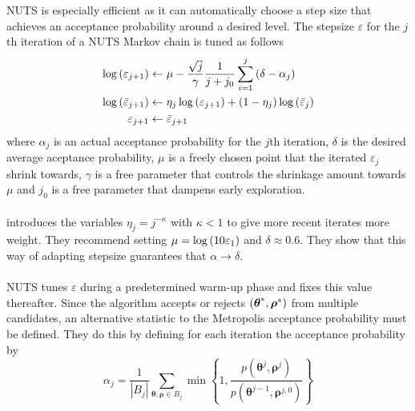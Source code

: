 \\
\\
NUTS is especially efficient as it can automatically choose a step size that achieves an acceptance probability around a desired level. The stepsize $\varepsilon$ for the $j$th iteration of a NUTS Markov chain is tuned as follows
\begin{equation*}
    \begin{split}
        \log\left (\varepsilon_{j+1}\right) &\leftarrow \mu - \frac{\sqrt{j}}{\gamma} \frac{1}{j + j_0} \sum_{i=1}^j \left (\delta - \alpha_j\right)\\
        \log \left (\bar{\varepsilon}_{j+1}\right) &\leftarrow \eta_j \log \left (\varepsilon_{j+1}\right) + \left (1 - \eta_j\right) \log \left (\bar{\varepsilon}_j\right) \\
        \varepsilon_{j+1} &\leftarrow \bar{\varepsilon}_{j+1}
    \end{split}
\end{equation*}
where $\alpha_j$ is an actual acceptance probability for the $j$th iteration, $\delta$ is the desired average aceptance probability, $\mu$ is a freely chosen point that the iterated $\varepsilon_j$ shrink towards, $\gamma$ is a free parameter that controls the shrinkage amount towards $\mu$ and $j_0$ is a free parameter that dampens early exploration. 
\\
\\
\cite{hoffman2011nouturn} introduces the variables $\eta_j = j^{-\kappa}$ with $\kappa < 1$ to give more recent iterates more weight. They recommend setting $\mu = \log \left (10 \varepsilon_1\right)$ and $\delta \approx 0.6$. They show that this way of adapting stepsize guarantees that $\alpha \rightarrow \delta$.
\\
\\
NUTS tunes $\varepsilon$ during a predetermined warm-up phase and fixes this value thereafter. Since the algorithm accepts or rejects $\left (\boldsymbol{\theta}^*, \boldsymbol{\rho}^*\right)$ from multiple candidates, an alternative statistic to the Metropolis acceptance probability must be defined. They do this by defining for each iteration the acceptance probability by
\begin{equation*}
    \alpha_{j}=\frac{1}{\left|B_{j}\right|} \sum_{\boldsymbol{\theta}, \boldsymbol{\rho} \in B_{j}} \min \left\{1, \frac{p\left(\boldsymbol{\theta}^{j}, \boldsymbol{\rho}^{j}\right)}{p\left(\boldsymbol{\theta}^{j-1}, \boldsymbol{\rho}^{j, 0}\right)}\right\}
\end{equation*}

